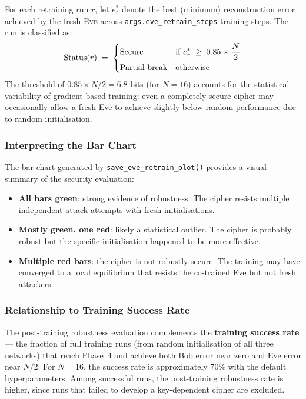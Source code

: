 \documentclass[12pt, a4paper]{article}
\newcommand{\eve}{\textsc{Eve}}
\newcommand{\code}[1]{\texttt{\color{CodeRed}#1}}
\begin{document}
For each retraining run $r$, let $e_r^*$ denote the best (minimum)
reconstruction error achieved by the fresh \eve{} across
\code{args.eve\_retrain\_steps} training steps. The run is
classified as:
%
\begin{equation}
  \text{Status}(r) \;=\;
  \begin{dcases}
    \text{Secure}        & \text{if } e_r^* \;\geq\; 0.85 \times \frac{N}{2} \\
    \text{Partial break} & \text{otherwise}
  \end{dcases}
  \label{eq:security_classification}
\end{equation}
%
The threshold of $0.85 \times N/2 = 6.8$ bits (for $N=16$) accounts
for the statistical variability of gradient-based training: even a
completely secure cipher may occasionally allow a fresh Eve to achieve
slightly below-random performance due to random initialisation.

\subsubsection*{Interpreting the Bar Chart}

The bar chart generated by \code{save\_eve\_retrain\_plot()} provides
a visual summary of the security evaluation:

\begin{itemize}[leftmargin=1.8em, itemsep=4pt]
  \item \textbf{All bars green}: strong evidence of robustness. The
        cipher resists multiple independent attack attempts with
        fresh initialisations.
  \item \textbf{Mostly green, one red}: likely a statistical outlier.
        The cipher is probably robust but the specific initialisation
        happened to be more effective.
  \item \textbf{Multiple red bars}: the cipher is not robustly secure.
        The training may have converged to a local equilibrium that
        resists the co-trained Eve but not fresh attackers.
\end{itemize}

\subsubsection*{Relationship to Training Success Rate}

The post-training robustness evaluation complements the
\textbf{training success rate} --- the fraction of full training runs
(from random initialisation of all three networks) that reach Phase~4
and achieve both Bob error near zero and Eve error near $N/2$. For
$N=16$, the success rate is approximately 70\% with the default
hyperparameters. Among successful runs, the post-training robustness
rate is higher, since runs that failed to develop a key-dependent cipher
are excluded.
\end{document}
